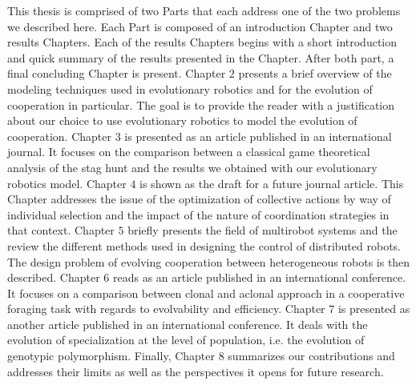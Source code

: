     This thesis is comprised of two Parts that each address one of the two problems we described here. Each Part is composed of an introduction Chapter and two results Chapters. Each of the results Chapters begins with a short introduction and quick summary of the results presented in the Chapter. After both part, a final concluding Chapter is present.
    Chapter $2$ presents a brief overview of the modeling techniques used in evolutionary robotics and for the evolution of cooperation in particular. The goal is to provide the reader with a justification about our choice to use evolutionary robotics to model the evolution of cooperation.
    Chapter $3$ is presented as an article published in an international journal. It focuses on the comparison between a classical game theoretical analysis of the stag hunt and the results we obtained with our evolutionary robotics model.
    Chapter $4$ is shown as the draft for a future journal article. This Chapter addresses the issue of the optimization of collective actions by way of individual selection and the impact of the nature of coordination strategies in that context.
    Chapter $5$ briefly presents the field of multirobot systems and the review the different methods used in designing the control of distributed robots. The design problem of evolving cooperation between heterogeneous robots is then described.
    Chapter $6$ reads as an article published in an international conference. It focuses on a comparison between clonal and aclonal approach in a cooperative foraging task with regards to evolvability and efficiency.
    Chapter $7$ is presented as another article published in an international conference. It deals with the evolution of specialization at the level of population, i.e. the evolution of genotypic polymorphism.
    Finally, Chapter $8$ summarizes our contributions and addresses their limits as well as the perspectives it opens for future research.
